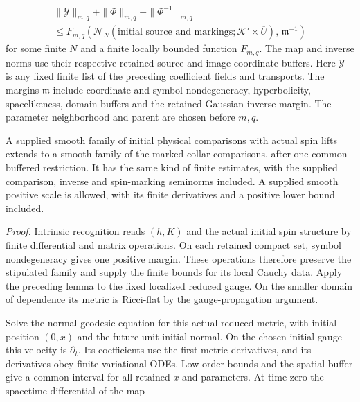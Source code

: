 \documentclass[
  english,
  11pt,
  reqno]{amsart}
\begin{document}
\label{eq:online-collar-finite-family-bound} \[
\begin{multlined}
\|\mathcal Y\|_{m,q}
+\|\Phi\|_{m,q}
+\|\Phi^{-1}\|_{m,q}
\\
\le
F_{m,q}\left(
\mathcal N_N(\text{initial source and markings};
\mathcal K'\times\overline U),\,
\mathfrak m^{-1}
\right)
\end{multlined}
\] for some finite \(N\) and a finite locally bounded function
\(F_{m,q}\). The map and inverse norms use their respective retained
source and image coordinate buffers. Here \(\mathcal Y\) is any fixed
finite list of the preceding coefficient fields and transports. The
margins \(\mathfrak m\) include coordinate and symbol nondegeneracy,
hyperbolicity, spacelikeness, domain buffers and the retained Gaussian
inverse margin. The parameter neighborhood and parent are chosen before
\(m,q\).

A supplied smooth family of initial physical comparisons with actual
spin lifts extends to a smooth family of the marked collar comparisons,
after one common buffered restriction. It has the same kind of finite
estimates, with the supplied comparison, inverse and spin-marking
seminorms included. A supplied smooth positive scale is allowed, with
its finite derivatives and a positive lower bound included.

\emph{Proof.}
\hyperref[thm:online-intrinsic-gradient-vacuum-recognition]{Intrinsic
recognition} reads \((h,K)\) and the actual initial spin structure by
finite differential and matrix operations. On each retained compact set,
symbol nondegeneracy gives one positive margin. These operations
therefore preserve the stipulated family and supply the finite bounds
for its local Cauchy data. Apply the preceding lemma to the fixed
localized reduced gauge. On the smaller domain of dependence its metric
is Ricci-flat by the gauge-propagation argument.

Solve the normal geodesic equation for this actual reduced metric, with
initial position \((0,x)\) and the future unit initial normal. On the
chosen initial gauge this velocity is \(\partial_t\). Its coefficients
use the first metric derivatives, and its derivatives obey finite
variational ODEs. Low-order bounds and the spatial buffer give a common
interval for all retained \(x\) and parameters. At time zero the
spacetime differential of the map
\end{document}
